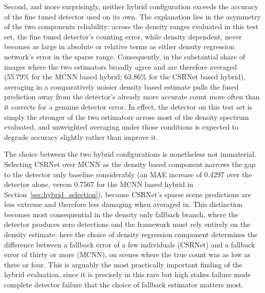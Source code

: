Second, and more surprisingly, neither hybrid configuration exceeds the accuracy of the fine tuned detector used on its own. The explanation lies in the asymmetry of the two components reliability: across the density ranges evaluated in this test set, the fine tuned detector's counting error, while density dependent, never becomes as large in absolute or relative terms as either density regression network's error in the sparse range. Consequently, in the substantial share of images where the two estimators broadly agree and are therefore averaged (55.79\% for the MCNN based hybrid; 63.86\% for the CSRNet based hybrid), averaging in a comparatively noisier density based estimate pulls the fused prediction away from the detector's already more accurate count more often than it corrects for a genuine detector error. In effect, the detector on this test set is simply the stronger of the two estimators across most of the density spectrum evaluated, and unweighted averaging under those conditions is expected to degrade accuracy slightly rather than improve it.

The choice between the two hybrid configurations is nonetheless not immaterial. Selecting CSRNet over MCNN as the density based component narrows the gap to the detector only baseline considerably (an MAE increase of 0.4297 over the detector alone, versus 0.7567 for the MCNN based hybrid in Section~\ref{sec:hybrid_selection}), because CSRNet's sparse scene predictions are less extreme and therefore less damaging when averaged in. This distinction becomes most consequential in the density only fallback branch, where the detector produces zero detections and the framework must rely entirely on the density estimate: here the choice of density regression component determines the difference between a fallback error of a few individuals (CSRNet) and a fallback error of thirty or more (MCNN), on scenes where the true count was as low as three or four. This is arguably the most practically important finding of the hybrid evaluation, since it is precisely in this rare but high stakes failure mode complete detector failure that the choice of fallback estimator matters most.